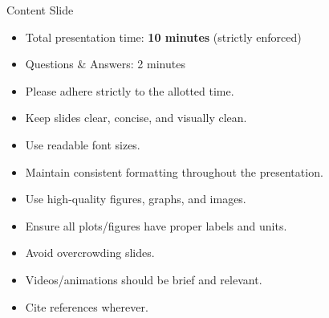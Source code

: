 \documentclass[aspectratio=169, 10pt]{beamer}
\begin{document}
\begin{frame}{Content Slide}
  \begin{itemize}
      \item Total presentation time: \textbf{10 minutes} (strictly enforced)
      \item Questions \& Answers: 2 minutes
      \item Please adhere strictly to the allotted time.
      \item Keep slides clear, concise, and visually clean.
      \item Use readable font sizes.
      \item Maintain consistent formatting throughout the presentation.
      \item Use high-quality figures, graphs, and images.
      \item Ensure all plots/figures have proper labels and units.
      \item Avoid overcrowding slides.
      \item Videos/animations should be brief and relevant.
      \item Cite references wherever.
  \end{itemize}
\end{frame}
\end{document}
